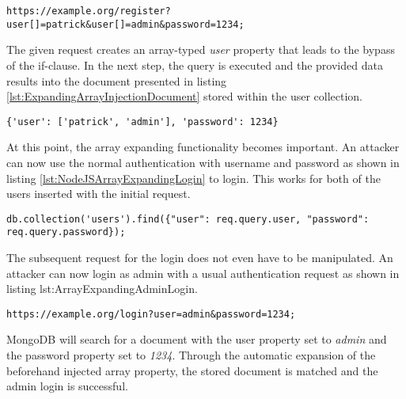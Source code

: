 \begin{lstlisting}[caption={Attack vector against MongoDB for expanding array injection via the query-string parameter}, label={lst:ExpandingArrayInjection}]
https://example.org/register?user[]=patrick&user[]=admin&password=1234;
\end{lstlisting}

The given request creates an array-typed \emph{user} property that leads to the bypass of the if-clause. In the next step, the query is executed and the provided data results into the document presented in listing \ref{lst:ExpandingArrayInjectionDocument} stored within the user collection.\\

\begin{lstlisting}[caption={Resulting parameter for expanding array injection}, label={lst:ExpandingArrayInjectionDocument}]
{'user': ['patrick', 'admin'], 'password': 1234}
\end{lstlisting}

At this point, the array expanding functionality becomes important. An attacker can now use the normal authentication with username and password as shown in listing \ref{lst:NodeJSArrayExpandingLogin} to login. This works for both of the users inserted with the initial request. \\

\begin{lstlisting}[caption={Login example affected by the preceding expanding array injection}, label={lst:NodeJSArrayExpandingLogin}]
db.collection('users').find({"user": req.query.user, "password": req.query.password});
\end{lstlisting}

The subsequent request for the login does not even have to be manipulated. An attacker can now login as admin with a usual authentication request as shown in listing {lst:ArrayExpandingAdminLogin}.\\

\begin{lstlisting}[caption={Usual login request exploiting the injected user array}, label={lst:ArrayExpandingAdminLogin}]
https://example.org/login?user=admin&password=1234;
\end{lstlisting}

MongoDB will search for a document with the user property set to \emph{admin} and the password property set to \emph{1234}. Through the automatic expansion of the beforehand injected array property, the stored document is matched and the admin login is successful.\\

